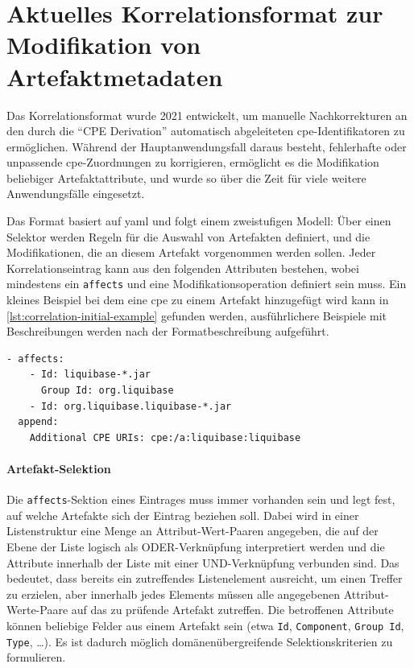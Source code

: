 \section{Aktuelles Korrelationsformat zur Modifikation von Artefaktmetadaten}\label{sec:current-correlation-format}

Das Korrelationsformat wurde 2021 entwickelt, um manuelle Nachkorrekturen an den durch die \enquote{CPE Derivation} automatisch abgeleiteten \acrshort{cpe}-Identifikatoren zu ermöglichen.
Während der Hauptanwendungsfall daraus besteht, fehlerhafte oder unpassende \acrshort{cpe}-Zuordnungen zu korrigieren, ermöglicht es die Modifikation beliebiger Artefaktattribute, und wurde so über die Zeit für viele weitere Anwendungsfälle eingesetzt.

Das Format basiert auf \acrfull{yaml} und folgt einem zweistufigen Modell:
Über einen Selektor werden Regeln für die Auswahl von Artefakten definiert, und die Modifikationen, die an diesem Artefakt vorgenommen werden sollen.
Jeder Korrelationseintrag kann aus den folgenden Attributen bestehen, wobei mindestens ein \texttt{affects} und eine Modifikationsoperation definiert sein muss.
Ein kleines Beispiel bei dem eine \acrshort{cpe} zu einem Artefakt hinzugefügt wird kann in \autoref{lst:correlation-initial-example} gefunden werden, ausführlichere Beispiele mit Beschreibungen werden nach der Formatbeschreibung aufgeführt.

\begin{lstlisting}[style=yaml,caption={Korrelationseintrag für die Java-Komponente Liquibase},label={lst:correlation-initial-example}]
- affects:
    - Id: liquibase-*.jar
      Group Id: org.liquibase
    - Id: org.liquibase.liquibase-*.jar
  append:
    Additional CPE URIs: cpe:/a:liquibase:liquibase
\end{lstlisting}

\paragraph{Artefakt-Selektion}
Die \texttt{affects}-Sektion eines Eintrages muss immer vorhanden sein und legt fest, auf welche Artefakte sich der Eintrag beziehen soll.
Dabei wird in einer Listenstruktur eine Menge an Attribut-Wert-Paaren angegeben, die auf der Ebene der Liste logisch als ODER-Verknüpfung interpretiert werden und die Attribute innerhalb der Liste mit einer UND-Verknüpfung verbunden sind.
Das bedeutet, dass bereits ein zutreffendes Listenelement ausreicht, um einen Treffer zu erzielen, aber innerhalb jedes Elements müssen alle angegebenen Attribut-Werte-Paare auf das zu prüfende Artefakt zutreffen.
Die betroffenen Attribute können beliebige Felder aus einem Artefakt sein (etwa \texttt{Id}, \texttt{Component}, \texttt{Group Id}, \texttt{Type}, \ldots).
Es ist dadurch möglich domänenübergreifende Selektionskriterien zu formulieren.

